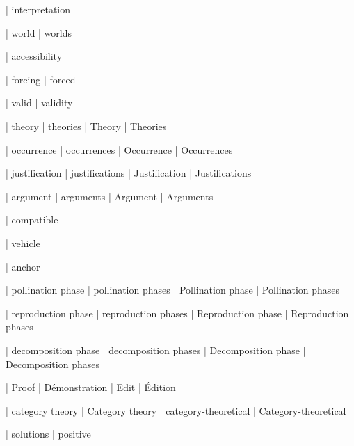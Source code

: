  | interpretation

 | world
 | worlds

 | accessibility

 | forcing
 | forced

 | valid
 | validity

 | theory
 | theories
 | Theory
 | Theories
 
 | occurrence
 | occurrences
 | Occurrence
 | Occurrences

 | justification
 | justifications
 | Justification
 | Justifications

 | argument
 | arguments
 | Argument
 | Arguments

 | compatible

 | vehicle

 | anchor
 
 | pollination phase
 | pollination phases
 | Pollination phase
 | Pollination phases

 | reproduction phase
 | reproduction phases
 | Reproduction phase
 | Reproduction phases

 | decomposition phase
 | decomposition phases
 | Decomposition phase
 | Decomposition phases

\newcommand\fpmode[1]{\begingroup\textsc{#1}\endgroup}
 | Proof
 | Démonstration
 | Edit
 | Édition






 | category theory
 | Category theory
 | category-theoretical
 | Category-theoretical


 | solutions
 | positive